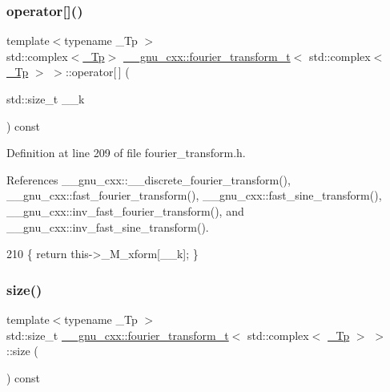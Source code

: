 \subsubsection{\texorpdfstring{operator[]()}{operator[]()}}
{\footnotesize\ttfamily template$<$typename \+\_\+\+Tp $>$ \\
std\+::complex$<$\hyperlink{namespace____gnu__cxx_a3b19a9c800ca194374ef9172290f7d79}{\+\_\+\+Tp}$>$ \hyperlink{class____gnu__cxx_1_1fourier__transform__t}{\+\_\+\+\_\+gnu\+\_\+cxx\+::fourier\+\_\+transform\+\_\+t}$<$ std\+::complex$<$ \hyperlink{namespace____gnu__cxx_a3b19a9c800ca194374ef9172290f7d79}{\+\_\+\+Tp} $>$ $>$\+::operator\mbox{[}$\,$\mbox{]} (\begin{DoxyParamCaption}\item[{std\+::size\+\_\+t}]{\+\_\+\+\_\+k }\end{DoxyParamCaption}) const\hspace{0.3cm}{\ttfamily [inline]}}



Definition at line 209 of file fourier\+\_\+transform.\+h.



References \+\_\+\+\_\+gnu\+\_\+cxx\+::\+\_\+\+\_\+discrete\+\_\+fourier\+\_\+transform(), \+\_\+\+\_\+gnu\+\_\+cxx\+::fast\+\_\+fourier\+\_\+transform(), \+\_\+\+\_\+gnu\+\_\+cxx\+::fast\+\_\+sine\+\_\+transform(), \+\_\+\+\_\+gnu\+\_\+cxx\+::inv\+\_\+fast\+\_\+fourier\+\_\+transform(), and \+\_\+\+\_\+gnu\+\_\+cxx\+::inv\+\_\+fast\+\_\+sine\+\_\+transform().


\begin{DoxyCode}
210       \{ \textcolor{keywordflow}{return} this->\_M\_xform[\_\_k]; \}
\end{DoxyCode}
\mbox{\label{class____gnu__cxx_1_1fourier__transform__t_3_01std_1_1complex_3_01__Tp_01_4_01_4_a1c6e363c86ed959497fd6ad5866802d6}} 
\subsubsection{\texorpdfstring{size()}{size()}}
{\footnotesize\ttfamily template$<$typename \+\_\+\+Tp $>$ \\
std\+::size\+\_\+t \hyperlink{class____gnu__cxx_1_1fourier__transform__t}{\+\_\+\+\_\+gnu\+\_\+cxx\+::fourier\+\_\+transform\+\_\+t}$<$ std\+::complex$<$ \hyperlink{namespace____gnu__cxx_a3b19a9c800ca194374ef9172290f7d79}{\+\_\+\+Tp} $>$ $>$\+::size (\begin{DoxyParamCaption}{ }\end{DoxyParamCaption}) const\hspace{0.3cm}{\ttfamily [inline]}}




